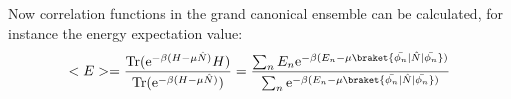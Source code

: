 Now correlation functions in the grand canonical ensemble can be calculated, for instance the energy expectation value:
\begin{equation}
	<E>=  \frac{\text{Tr}(\text{e}^{-\beta(H-\mu \hat{N}) }H)}{\text{Tr}(\text{e}^{-\beta (H-\mu \hat{N})})} = \frac{\sum_{n}^{}E_n\text{e}^{-\beta (E_n-\mu\braket{\bar{\phi_n}|\hat{N}|\bar{\phi_n}})}}{\sum_{n}^{}\text{e}^{-\beta (E_n-\mu\braket{\bar{\phi_n}|\hat{N}|\bar{\phi_n}})}}\label{expvaluegc}
\end{equation}